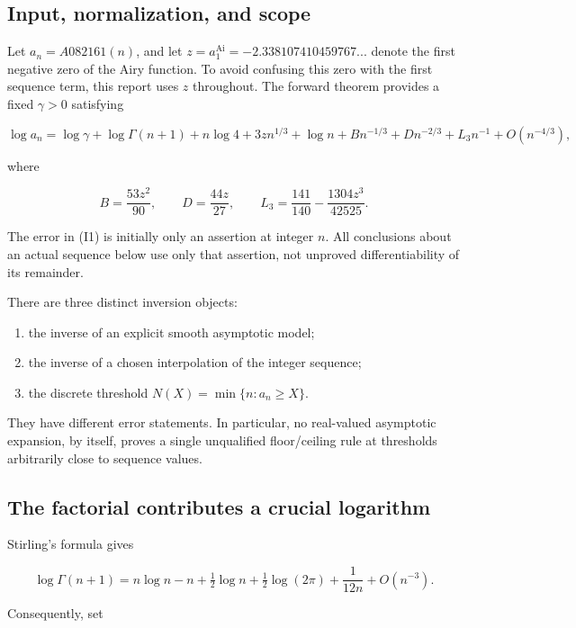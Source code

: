 \documentclass[11pt,letterpaper]{article}
\numberwithin{equation}{section}
\theoremstyle{remark}
\providecommand{\tightlist}{\setlength{\itemsep}{0pt}\setlength{\parskip}{0pt}}
\begin{document}
\subsection{Input, normalization, and scope}\label{air:rb:input-normalization-and-scope}

Let \(a_n=A082161(n)\), and let \(z=a_1^{\operatorname{Ai}}=-2.338107410459767...\) denote the first negative zero of the Airy function. To avoid confusing this zero with the first sequence term, this report uses \(z\) throughout. The forward theorem provides a fixed \(\gamma>0\) satisfying

\[
\log a_n=\log\gamma+\log\Gamma(n+1)+n\log4+3z n^{1/3}+\log n
+B n^{-1/3}+D n^{-2/3}+L_3 n^{-1}+O(n^{-4/3}),
\tag{I1}
\]

where

\[
B=\frac{53z^2}{90},\qquad D=\frac{44z}{27},\qquad
L_3=\frac{141}{140}-\frac{1304z^3}{42525}.
\tag{I2}
\]

The error in (I1) is initially only an assertion at integer \(n\). All conclusions about an actual sequence below use only that assertion, not unproved differentiability of its remainder.

There are three distinct inversion objects:

\begin{enumerate}
\def\labelenumi{\arabic{enumi}.}
\tightlist
\item
  the inverse of an explicit smooth asymptotic model;
\item
  the inverse of a chosen interpolation of the integer sequence;
\item
  the discrete threshold \(N(X)=\min\{n:a_n\ge X\}\).
\end{enumerate}

They have different error statements. In particular, no real-valued asymptotic expansion, by itself, proves a single unqualified floor/ceiling rule at thresholds arbitrarily close to sequence values.

\subsection{The factorial contributes a crucial logarithm}\label{air:rb:the-factorial-contributes-a-crucial-logarithm}

Stirling's formula gives

\[
\log\Gamma(n+1)=n\log n-n+\tfrac12\log n+
\tfrac12\log(2\pi)+\frac1{12n}+O(n^{-3}).
\]

Consequently, set
\end{document}
